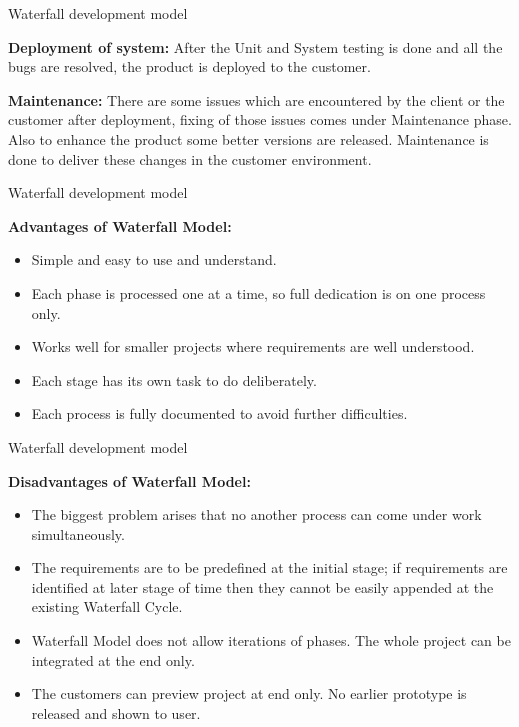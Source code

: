 \documentclass{beamer}
\begin{document}
\begin{frame}{\centerline{Waterfall development model}}


\textbf{Deployment of system:} After the Unit and System testing is done and all the bugs are resolved, the product is deployed to the customer.
\newline

\textbf{Maintenance:} There are some issues which are encountered by the client or the customer after deployment, fixing of those issues comes under Maintenance phase. Also to enhance the product some better versions are released. Maintenance is done to deliver these changes in the customer environment.
\newline

\end{frame}
\begin{frame}{\centerline{Waterfall development model}}

\textbf{Advantages of Waterfall Model:}
\begin{itemize}
\item  Simple and easy to use and understand.

\item  Each phase is processed one at a time, so full dedication is on one process only.

\item  Works well for smaller projects where requirements are well understood.

\item  Each stage has its own task to do deliberately.

\item  Each process is fully documented to avoid further difficulties.

\end{itemize}

\end{frame}
\begin{frame}{\centerline{Waterfall development model}}

\textbf{Disadvantages of Waterfall Model:}
\begin{itemize}
\item  The biggest problem arises that no another process can come under work simultaneously.

\item  The requirements are to be predefined at the initial stage; if requirements are identified at later stage of time then they cannot be easily appended at the existing Waterfall Cycle.

\item  Waterfall Model does not allow iterations of phases. The whole project can be integrated at the end only.

\item  The customers can preview project at end only. No earlier prototype is released and shown to user.
\end{itemize}


\end{frame}
\end{document}
